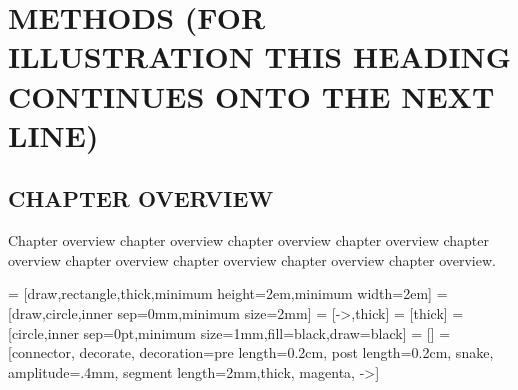 
\chapter{METHODS (FOR ILLUSTRATION THIS HEADING CONTINUES ONTO THE NEXT LINE)}

\section{CHAPTER OVERVIEW}

Chapter overview chapter overview chapter overview chapter overview
chapter overview chapter overview chapter overview chapter overview
chapter overview.

 = [draw,rectangle,thick,minimum height=2em,minimum width=2em]
 = [draw,circle,inner sep=0mm,minimum size=2mm]
 = [->,thick]
 = [thick]
 = [circle,inner sep=0pt,minimum size=1mm,fill=black,draw=black]
 = []
 = [connector, decorate, decoration={pre length=0.2cm,
                         post length=0.2cm, snake, amplitude=.4mm,
                         segment length=2mm},thick, magenta, ->]

\renewcommand{\vec}[1]{\ensuremath{\boldsymbol{#1}}} %
\def \myneq {\skew{-2}\not =} %

